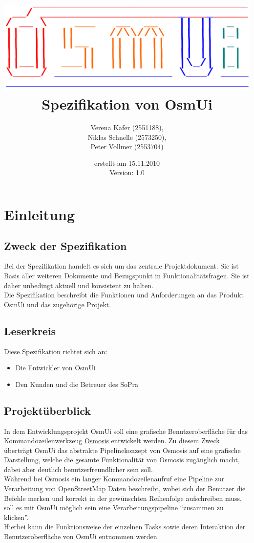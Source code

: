 \documentclass[a4paper,12pt]{scrartcl}
\author{
Verena Käfer (2551188),\\
Niklas Schnelle (2573250),\\
Peter Vollmer (2553704)}
\date{erstellt am 15.11.2010\\
Version: 1.0}
\title{\includegraphics[width=15cm]{../projektplan/Logo_Osmui.png} \\ 
Spezifikation von OsmUi}
\begin{document}
\maketitle
\newpage
\tableofcontents
\newpage

\section{Einleitung}
\subsection{Zweck der Spezifikation}
Bei der Spezifikation handelt es sich um das zentrale Projektdokument. Sie ist Basis aller weiteren Dokumente und
Bezugspunkt in Funktionalitätsfragen. Sie ist daher unbedingt aktuell und konsistent zu halten.\\
Die Spezifikation beschreibt die Funktionen und Anforderungen an das Produkt OsmUi und das zugehörige Projekt.
\subsection{Leserkreis}
Diese Spezifikation richtet sich an:
\begin{itemize}
 \item Die Entwickler von OsmUi
 \item Den Kunden und die Betreuer des SoPra
\end{itemize}

\subsection{Projektüberblick}
In dem Entwicklungsprojekt OsmUi soll eine grafische Benutzeroberfläche für das Kommandozeilenwerkzeug \href{http://wiki.openstreetmap.org/wiki/Osmosis}{Osmosis}
entwickelt werden. Zu diesem Zweck überträgt OsmUi das abstrakte Pipelinekonzept von Osmosis auf eine grafische Darstellung, welche die gesamte Funktionalität von Osmosis zugänglich macht, dabei aber deutlich benutzerfreundlicher sein soll.\\
Während bei Osmosis ein langer Kommandozeilenaufruf eine Pipeline zur Verarbeitung von OpenStreetMap Daten beschreibt, wobei sich der Benutzer die Befehle merken
und korrekt in der gewünschten Reihenfolge aufschreiben muss, soll es mit OsmUi möglich sein eine Verarbeitungspipeline ``zusammen zu klicken''.\\
Hierbei kann die Funktionsweise der einzelnen Tasks sowie deren Interaktion der Benutzeroberfläche von OsmUi entnommen werden.
\end{document}
